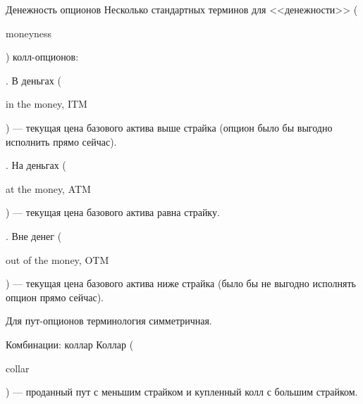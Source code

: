 \documentclass{beamer}
\newcommand{\en}[1]{\begin{otherlanguage}{english}#1\end{otherlanguage}}
\begin{document}
\begin{frame}{Денежность опционов}
\justify
Несколько стандартных терминов для <<денежности>> (\en{moneyness}) колл-опционов:

. В деньгах (\en{in the money, ITM}) --- текущая цена базового актива выше страйка (опцион было бы выгодно исполнить прямо сейчас).

. На деньгах (\en{at the money, ATM}) --- текущая цена базового актива равна страйку.

. Вне денег (\en{out of the money, OTM}) --- текущая цена базового актива ниже страйка (было бы не выгодно исполнять опцион прямо сейчас).

\justify
Для пут-опционов терминология симметричная.
\end{frame}



\begin{frame}{Комбинации: коллар}
\justifying
Коллар (\en{collar}) --- проданный пут с меньшим страйком и купленный колл с большим страйком.

\justifying
\centering
\end{frame}
\end{document}
